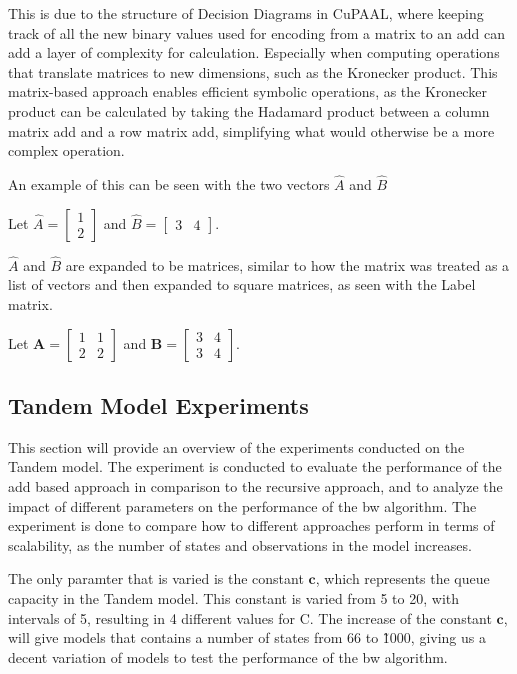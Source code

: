 This is due to the structure of Decision Diagrams in CuPAAL, where keeping track of all the new binary values used for encoding from a matrix to an \gls{add} can add a layer of complexity for calculation.
Especially when computing operations that translate matrices to new dimensions, such as the Kronecker product.
This matrix-based approach enables efficient symbolic operations, as the Kronecker product can be calculated by taking the Hadamard product between a column matrix \gls{add} and a row matrix \gls{add}, simplifying what would otherwise be a more complex operation.

An example of this can be seen with the two vectors $\hat{A}$ and $\hat{B}$

Let $\hat{A} = \begin{bmatrix}
            1 \\
            2
      \end{bmatrix}$
and $\hat{B}=\begin{bmatrix}
            3 & 4
      \end{bmatrix}$.

$\hat{A}$ and $\hat{B}$ are expanded to be matrices, similar to how the matrix was treated as a list of vectors and then expanded to square matrices, as seen with the Label matrix.

Let $\mathbf{A} = \begin{bmatrix}
            1 & 1 \\
            2 & 2
      \end{bmatrix}$ and
$\mathbf{B} = \begin{bmatrix}
            3 & 4 \\
            3 & 4
      \end{bmatrix}$.


\subsection{Tandem Model Experiments}\label{subsec:tandem_model_experiments}
This section will provide an overview of the experiments conducted on the Tandem model.
The experiment is conducted to evaluate the performance of the \gls{add} based approach in comparison to the recursive approach, and to analyze the impact of different parameters on the performance of the \gls{bw} algorithm.
The experiment is done to compare how to different approaches perform in terms of scalability, as the number of states and observations in the model increases.

The only paramter that is varied is the constant $\mathbf{c}$, which represents the queue capacity in the Tandem model. This constant is varied from 5 to 20, with intervals of 5, resulting in 4 different values for C.
The increase of the constant $\mathbf{c}$, will give models that contains a number of states from 66 to \~1000, giving us a decent variation of models to test the performance of the \gls{bw} algorithm.

